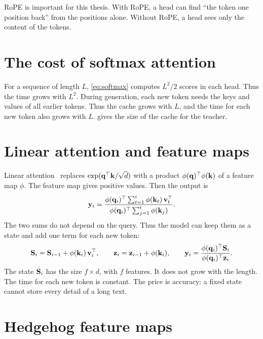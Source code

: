 RoPE is important for this thesis. With RoPE, a head can find \enquote{the token one position back} from the positions alone. Without RoPE, a head sees only the content of the tokens.

\section{The cost of softmax attention}
\label{sec:cost}

For a sequence of length $L$, \cref{eq:softmax} computes $L^2/2$ scores in each head. Thus the time grows with $L^2$. During generation, each new token needs the keys and values of all earlier tokens. Thus the cache grows with $L$, and the time for each new token also grows with $L$.  gives the size of the cache for the teacher.

\section{Linear attention and feature maps}
\label{sec:linear}

Linear attention~\cite{katharopoulos2020} replaces $\exp(\mathbf{q}^\top\mathbf{k}/\sqrt{d})$ with a product $\phi(\mathbf{q})^\top \phi(\mathbf{k})$ of a feature map $\phi$. The feature map gives positive values. Then the output is
\begin{equation}
\mathbf{y}_i = \frac{\phi(\mathbf{q}_i)^\top \sum_{t=1}^{i} \phi(\mathbf{k}_t)\, \mathbf{v}_t^\top}{\phi(\mathbf{q}_i)^\top \sum_{j=1}^{i} \phi(\mathbf{k}_j)} .
\label{eq:linear}
\end{equation}
The two sums do not depend on the query. Thus the model can keep them as a state and add one term for each new token:
\begin{equation}
\mathbf{S}_i = \mathbf{S}_{i-1} + \phi(\mathbf{k}_i)\, \mathbf{v}_i^\top, \qquad \mathbf{z}_i = \mathbf{z}_{i-1} + \phi(\mathbf{k}_i), \qquad \mathbf{y}_i = \frac{\phi(\mathbf{q}_i)^\top \mathbf{S}_i}{\phi(\mathbf{q}_i)^\top \mathbf{z}_i} .
\label{eq:linear-recurrent}
\end{equation}
The state $\mathbf{S}_i$ has the size $f \times d$, with $f$ features. It does not grow with the length. The time for each new token is constant. The price is accuracy: a fixed state cannot store every detail of a long text.

\section{Hedgehog feature maps}
\label{sec:hedgehog}

